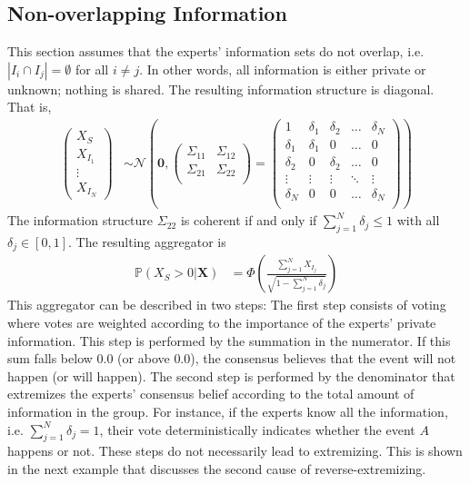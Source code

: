 \documentclass[11pt]{article}
\renewcommand{\P}{\mathbb{P}}
\theoremstyle{definition}
\theoremstyle{definition}
\begin{document}
\subsection{Non-overlapping Information}
\label{nonoverlap}
This section assumes that the experts' information sets do not overlap, i.e.   $|I_{i} \cap I_{j}| = \emptyset$ for all $i \neq j$. In other words, all information is either private or unknown; nothing is shared. The resulting information structure is diagonal.  That is,
\begin{align*}
\left(\begin{matrix} X_{S} \\ X_{I_1}\\ \vdots \\ X_{I_N} \end{matrix}\right) &\sim \mathcal{N}\left( 
 \boldsymbol{0}, \left(\begin{matrix} 
\Sigma_{11} & \Sigma_{12}\\
\Sigma_{21} & \Sigma_{22}\\
 \end{matrix}\right) 
 =
 \left(\begin{array}{c|cccc}
1 & \delta_1 & \delta_2 & \dots & \delta_N  \\ \hline
\delta_1 & \delta_1 &0 & \dots & 0   \\ 
\delta_2 & 0 & \delta_2 & \dots & 0  \\ 
\vdots & \vdots & \vdots & \ddots & \vdots  \\ 
\delta_N & 0 & 0 & \dots & \delta_N\\ 
 \end{array}\right)\right)
\end{align*}
The information structure $\Sigma_{22}$  is coherent if and only if $\sum_{j=1}^N \delta_j \leq 1$ with all $\delta_j \in [0,1]$. The resulting aggregator is 
\begin{align}
\P\left(X_{S} > 0 | \boldsymbol{X}\right) &= \Phi\left( \frac{\sum_{j=1}^N X_{I_j}}{\sqrt{1 - \sum_{j=1}^N \delta_j}}\right) \label{VotingAggre}
\end{align}
This aggregator can be described in two steps: The first step consists of voting where votes are weighted according to the importance of the experts' private information. This step is performed by the summation in the numerator. If this sum falls below $0.0$ (or above $0.0$), the consensus believes that the event will not happen (or will happen). The second step is performed by the denominator that extremizes the experts'  consensus belief according to the total amount of information in the group. For instance, if the experts know all the information, i.e. $\sum_{j=1}^N \delta_j = 1$, their vote deterministically indicates whether the event $A$ happens or not. These steps do not necessarily lead to extremizing. This is shown in the next example that discusses the second cause of reverse-extremizing.
\end{document}
